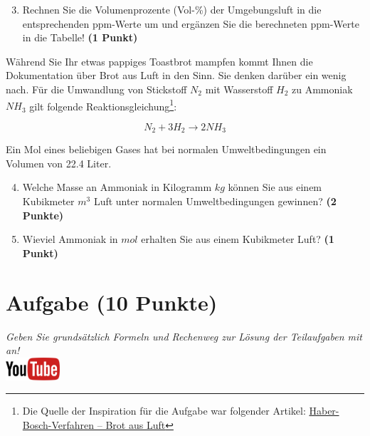 \documentclass[a4paper, 9pt]{scrartcl}\usepackage[]{graphicx}\usepackage[]{xcolor}
\begin{document}
\begin{enumerate}
   \setcounter{enumi}{2}
\item Rechnen Sie die Volumenprozente (Vol-\%) der Umgebungsluft in die
  entsprechenden ppm-Werte um und ergänzen Sie die berechneten ppm-Werte in
  die Tabelle!  \textbf{(1 Punkt)}
\end{enumerate}

Während Sie Ihr etwas pappiges Toastbrot mampfen kommt Ihnen die Dokumentation über Brot aus Luft in den Sinn. Sie denken darüber ein wenig nach. Für die Umwandlung von Stickstoff $N_2$ mit Wasserstoff $H_2$ zu Ammoniak
$NH_3$ gilt folgende Reaktionsgleichung\footnote{Die Quelle der Inspiration
  für die Aufgabe war folgender Artikel:
  \href{https://www.gdch.de/netzwerk-strukturen/fachstrukturen/ag-chemie-und-gesellschaft/projekte-und-veranstaltungen/cartoons/haber-bosch-verfahren-brot-aus-luft.html}{Haber-Bosch-Verfahren – Brot aus Luft}}:

\begin{equation*}
  N_2 + 3H_2 \rightarrow 2NH_3
\end{equation*}  

Ein Mol eines beliebigen Gases hat bei normalen Umweltbedingungen ein
Volumen von 22.4 Liter. %

\begin{enumerate}
  \setcounter{enumi}{3}
\item Welche Masse an Ammoniak in Kilogramm $kg$ können Sie aus einem
  Kubikmeter $m^3$ Luft unter normalen Umweltbedingungen gewinnen?
  \textbf{(2 Punkte)}
\item Wieviel Ammoniak in $mol$ erhalten Sie aus einem Kubikmeter Luft?
  \textbf{(1 Punkt)}
\end{enumerate}

 
\clearpage

\section{Aufgabe \hfill (10 Punkte)}

\textit{Geben Sie grunds{\"a}tzlich Formeln und Rechenweg zur L{\"o}sung der
  Teilaufgaben mit an!} \\[1Ex]

\hfill\href{https://youtu.be/Bbu6n8MXxQk}{\includegraphics[width =
  2cm]{img/youtube}} %
\hspace{2Ex}
\end{document}
